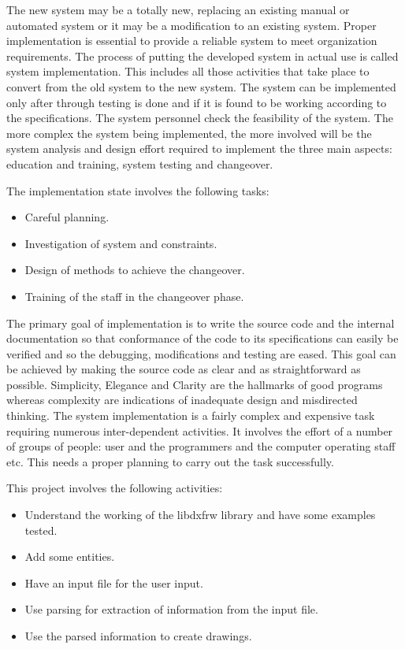 The new system may be a totally new, replacing an existing manual or automated system or it may be a modification to an existing system. Proper implementation is essential to provide a reliable system to meet organization requirements. The process of putting the developed system in actual use is called system implementation. This includes all those activities that take place to convert from the old system to the new system. The system can be implemented only after through testing is done and if it is found to be working according to the specifications. The system personnel check the feasibility of the system. The more complex the system being implemented, the more involved will be the system analysis and design effort required to implement the three main aspects: education and training, system testing and changeover. 

The implementation state involves the following tasks:
\begin{itemize}
	\item Careful planning.
	\item Investigation of system and constraints.
	\item Design of methods to achieve the changeover.
	\item Training of the staff in the changeover phase.
\end{itemize}

The primary goal of implementation is to write the source code and the internal documentation so that conformance of the code to its specifications can easily be verified and so the debugging, modifications and testing are eased. This goal can be achieved by making the source code as clear and as straightforward as possible. Simplicity, Elegance and Clarity are the hallmarks of good programs whereas complexity are indications of inadequate design and misdirected thinking. The system implementation is a fairly complex and expensive task requiring numerous inter-dependent activities. It involves the effort of a number of groups of people: user and the programmers and the computer operating staff etc. This needs a proper planning to carry out the task successfully.

This project involves the following activities:
\begin{itemize}
	\item Understand the working of the libdxfrw library and have some examples tested.
	\item Add some entities.
	\item Have an input file for the user input.
	\item Use parsing for extraction of information from the input file.
	\item Use the parsed information to create drawings.
\end{itemize}	

